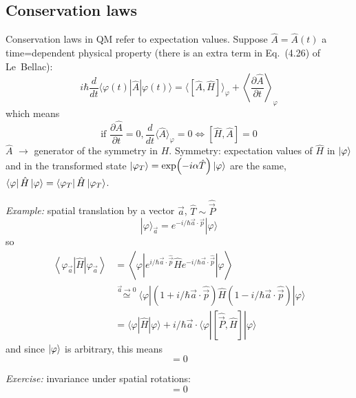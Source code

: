 \documentclass[12pt]{article}
\newcommand{\be}{\begin{equation}}
\newcommand{\ee}{\end{equation}}
\begin{document}
\subsection{Conservation laws}

Conservation laws in QM refer to expectation values.
Suppose $\hat{A} = \hat{A}(t)$ a time=dependent physical property
(there is an extra term in Eq.~(4.26) of Le~Bellac):
\be
i\hbar \frac{d}{d t}\langle\varphi(t)|\hat{A}| \varphi(t)\rangle=\langle[\hat{A}, \hat{H}]\rangle_{\varphi}+\left\langle\frac{\partial \hat{A}}{\partial t}\right\rangle_{\varphi}
\ee
which means
\be
\text{if }\frac{\partial \hat{A}}{\partial t}=0, \frac{d}{d t}\langle\hat{A}\rangle_{\varphi}=0 \Leftrightarrow[\hat{H}, \hat{A}]=0
\ee
$\hat{A}$ $\rightarrow$ generator of the symmetry in $H$.
Symmetry: expectation values of $\hat H$ in $\ket{\varphi}$ and in
the transformed state $\ket{\varphi_T} = \exp(-i\alpha\hat{T})\ket{\varphi}$ are the same, $\bra{\varphi}\hat{H}\ket{\varphi} = \bra{\varphi_T}\hat{H}\ket{\varphi_T}$.

\emph{Example:} spatial translation by a vector $\vec{a}$, $\hat{T} \sim \hat{\vec{P}}$
\be
|\varphi\rangle_{\vec{a}}=e^{-i / \hbar \vec{a} \cdot \vec{p}}|\varphi\rangle
\ee
so
\[
\begin{aligned}
\left\langle\varphi_{\vec{a}}|\hat{H}| \varphi_{\vec{a}}\right\rangle 
&=\left\langle\varphi\left|e^{i / \hbar \vec{a} \cdot \hat{\vec{p}}} \hat{H} e^{-i / \hbar \vec{a} \cdot \hat{\vec{p}}}\right| \varphi\right\rangle \\ 
& \stackrel{\vec{a} \rightarrow 0}{\simeq}
\langle\varphi|
(1+i / \hbar \vec{a} \cdot \hat{\vec{p}}) \hat{H}
(1-i / \hbar \vec{a} \cdot \hat{\vec{p}})|\varphi\rangle\\
&=\langle\varphi|\hat{H}| \varphi\rangle+i / \hbar \vec{a} \cdot\langle\varphi|[\hat{\vec{P}}, \hat{H}]| \varphi\rangle
\end{aligned}
\]
and since $\ket{\varphi}$ is arbitrary, this means
\be
[\hat{\vec{P}}, \hat{H}] = 0
\ee

\emph{Exercise:} invariance under spatial rotations:
\be
[\hat{\vec{J}}, \hat{H}] = 0
\ee
\end{document}
